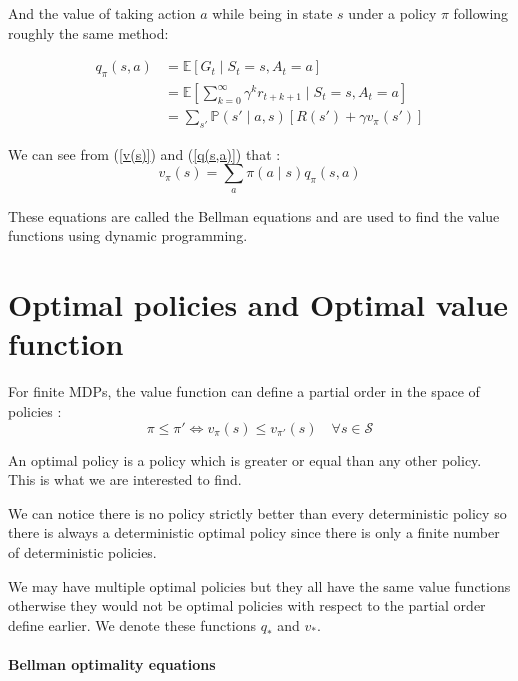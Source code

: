\documentclass[14pt,a4paper]{article}
\def\iff{\Leftrightarrow}
\theoremstyle{definition}
\begin{document}
And the value of taking action $a$ while being in state $s$ under a policy $\pi$ following roughly the same method:

\begin{equation}
\begin{split}
q_{\pi}(s,a)&= \mathbb{E}\left[G_t\mid S_t=s, A_t=a\right]
\\&=\mathbb{E}\left[\sum_{k=0}^{\infty}\gamma^{k}r_{t+k+1}\mid S_t=s,A_t=a\right]
\\&= \sum_{s'}\mathbb{P}(s'\mid a,s)\left[R(s')+\gamma v_{\pi}(s')\right]
\end{split}
\label{q(s,a)}
\end{equation}



We can see from (\ref{v(s)}) and (\ref{q(s,a)})  that : 
\begin{equation}
v_{\pi}(s)=\sum_{a}\pi(a\mid s)q_{\pi}(s,a)
\end{equation}

These equations are called the Bellman equations and are used to find the value functions using dynamic programming.




\section{Optimal policies and Optimal value function}

For finite MDPs, the value function can define a partial order in the space of policies : 
$$ 
\pi\leq \pi' \iff v_{\pi} (s)\leq v_{\pi'} (s) \quad \forall s \in \mathcal{S}
$$

An optimal policy is a policy which is greater or equal than any other policy. This is what we are interested to find.

We can notice there is no policy strictly better than every deterministic policy \citep{Puterman} so there is always a deterministic optimal policy since there is only a finite number of deterministic policies.


We may have multiple optimal policies but they all have the same value functions otherwise they would not be optimal policies with respect to the partial order define earlier. We denote these functions $q_{*}$ and $v_{*}$.

\paragraph{Bellman optimality equations}
\end{document}
